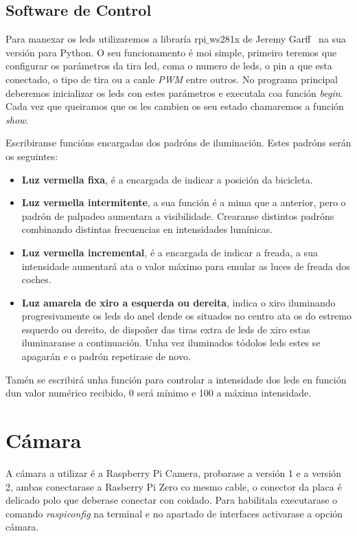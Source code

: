 \subsection{Software de Control}
Para manexar os leds utilizaremos a libraría rpi\(\_\)ws281x de Jeremy Garff~\cite{garffUserspaceRaspberryPi2019} na sua versión para Python. O seu funcionamento é moi simple, primeiro teremos que configurar os parámetros da tira led, coma o numero de leds, o pin a que esta conectado, o tipo de tira  ou a canle \emph{PWM} entre outros. No programa principal deberemos inicializar os leds con estes parámetros e executala coa función \emph{begin}. Cada vez que queiramos que os les cambien os seu estado chamaremos a función \emph{show}.

Escribiranse funcións encargadas dos padróns de iluminación. Estes padróns serán os seguintes:
\begin{itemize}
    \item \textbf{Luz vermella fixa},
    é a encargada de indicar a posición da bicicleta.
    \item \textbf{Luz vermella intermitente},
    a sua función é a mima que a anterior, pero o padrón de palpadeo aumentara a visibilidade. Crearanse distintos padróns combinando distintas frecuencias en intensidades lumínicas.
    \item \textbf{Luz vermella incremental},
    é a encargada de indicar a freada, a sua intensidade aumentará ata o valor máximo para emular as luces de freada dos coches.
    \item \textbf{Luz amarela de xiro a esquerda ou dereita},
    indica o xiro iluminando progresivamente os leds do anel dende os situados no centro ata os do estremo esquerdo ou dereito, de dispoñer das tiras extra de leds de xiro estas iluminaranse a continuación. Unha vez iluminados tódolos leds estes se apagarán e o padrón repetirase de novo.
\end{itemize}

Tamén se escribirá unha función para controlar a intensidade dos leds en función dun valor numérico recibido, 0 será mínimo e 100 a máxima intensidade.

\section{Cámara}

A cámara a utilizar é a Raspberry Pi Camera, probarase a versión 1 e a versión 2, ambas conectarase a Rasberry Pi Zero co mesmo cable, o conector da placa é delicado polo que deberase conectar con coidado. Para habilitala executarase o comando \emph{raspiconfig} na terminal e no apartado de interfaces activarase a opción cámara.

